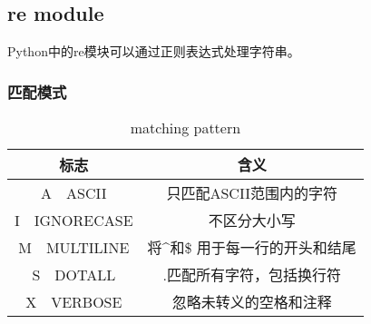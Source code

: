  \subsection{re module}
    Python中的re模块可以通过正则表达式处理字符串。
    \subsubsection{匹配模式}
      \begin{table}[H]
        \centering
        \caption{matching pattern}
        \label{tab:matching pattern}
        \begin{tabular}{cc}
          \toprule[1.5pt]
          标志 & 含义 \\
          \midrule
          A~~ASCII & 只匹配ASCII范围内的字符 \\
          I~~IGNORECASE & 不区分大小写 \\
          M~~MULTILINE & 将\^{}和\$ 用于每一行的开头和结尾 \\
          S~~DOTALL & .匹配所有字符，包括换行符 \\
          X~~VERBOSE & 忽略未转义的空格和注释 \\
          \bottomrule[1.5pt]
        \end{tabular}
      \end{table}

